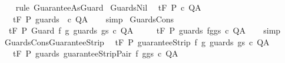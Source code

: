 \begin{isabellebody}
%
\isadelimproof
\ \ %
\endisadelimproof
%
\isatagproof
{}\isamarkupfalse%
\ {\isacharparenleft}rule\ GuaranteeAsGuard{\isacharparenright}%
\endisatagproof
{\isafoldproof}%
%
\isadelimproof
\isanewline
%
\endisadelimproof
\isanewline
{}\isamarkupfalse%
\ GuardsNil{\isacharcolon}\isanewline
\ \ {\isachardoublequoteopen}{\isasymGamma}{\isacharcomma}{\isasymTheta}{\isasymturnstile}\isactrlsub t\isactrlbsub {\isacharslash}F\isactrlesub \ P\ c\ Q{\isacharcomma}A\ {\isasymLongrightarrow}\ \isanewline
\ \ \ {\isasymGamma}{\isacharcomma}{\isasymTheta}{\isasymturnstile}\isactrlsub t\isactrlbsub {\isacharslash}F\isactrlesub \ P\ {\isacharparenleft}guards\ {\isacharbrackleft}{\isacharbrackright}\ c{\isacharparenright}\ Q{\isacharcomma}A{\isachardoublequoteclose}\isanewline
%
\isadelimproof
\ \ %
\endisadelimproof
%
\isatagproof
{}\isamarkupfalse%
\ simp%
\endisatagproof
{\isafoldproof}%
%
\isadelimproof
\isanewline
%
\endisadelimproof
\isanewline
{}\isamarkupfalse%
\ GuardsCons{\isacharcolon}\isanewline
\ \ {\isachardoublequoteopen}{\isasymGamma}{\isacharcomma}{\isasymTheta}{\isasymturnstile}\isactrlsub t\isactrlbsub {\isacharslash}F\isactrlesub \ P\ Guard\ f\ g\ {\isacharparenleft}guards\ gs\ c{\isacharparenright}\ Q{\isacharcomma}A\ {\isasymLongrightarrow}\ \isanewline
\ \ \ {\isasymGamma}{\isacharcomma}{\isasymTheta}{\isasymturnstile}\isactrlsub t\isactrlbsub {\isacharslash}F\isactrlesub \ P\ {\isacharparenleft}guards\ {\isacharparenleft}{\isacharparenleft}f{\isacharcomma}g{\isacharparenright}{\isacharhash}gs{\isacharparenright}\ c{\isacharparenright}\ Q{\isacharcomma}A{\isachardoublequoteclose}\isanewline
%
\isadelimproof
\ \ %
\endisadelimproof
%
\isatagproof
{}\isamarkupfalse%
\ simp%
\endisatagproof
{\isafoldproof}%
%
\isadelimproof
\isanewline
%
\endisadelimproof
\isanewline
{}\isamarkupfalse%
\ GuardsConsGuaranteeStrip{\isacharcolon}\isanewline
\ \ {\isachardoublequoteopen}{\isasymGamma}{\isacharcomma}{\isasymTheta}{\isasymturnstile}\isactrlsub t\isactrlbsub {\isacharslash}F\isactrlesub \ P\ guaranteeStrip\ f\ g\ {\isacharparenleft}guards\ gs\ c{\isacharparenright}\ Q{\isacharcomma}A\ {\isasymLongrightarrow}\ \isanewline
\ \ \ {\isasymGamma}{\isacharcomma}{\isasymTheta}{\isasymturnstile}\isactrlsub t\isactrlbsub {\isacharslash}F\isactrlesub \ P\ {\isacharparenleft}guards\ {\isacharparenleft}guaranteeStripPair\ f\ g{\isacharhash}gs{\isacharparenright}\ c{\isacharparenright}\ Q{\isacharcomma}A{\isachardoublequoteclose}\isanewline
%
\isadelimproof
\ \ %
\endisadelimproof
%

\end{isabellebody}
